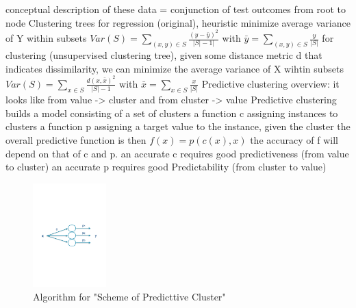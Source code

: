 \begin{outline}
            \3 conceptual description of these data = conjunction of test outcomes from root to node
    \1 Clustering trees
        \2 for regression (original), heuristic minimize average variance of Y within subsets
            \3 $Var(S) = \sum_{(x,y) \in S} \frac{(y - \bar{y})^{2}}{|S|-1|}$ 
            \3 with $\bar{y} = \sum_{(x,y) \in S} \frac{y}{|S|}$
        \2 for clustering (unsupervised clustering tree), given some distance metric d that indicates dissimilarity, we can minimize the average variance of X wihtin subsets
            \3 $Var(S) = \sum_{x \in S} \frac{d(x,\bar{x})^{2}}{|S|-1}$
            \3 with $\bar{x} = \sum_{x \in S} \frac{x}{|S|}$
    \1 Predictive clustering
        \2 overview: it looks like from value -> cluster and from cluster -> value
        \2 Predictive clustering builds a model consisting of 
            \3 a set of clusters
            \3 a function c assigning instances to clusters
            \3 a function p assigning a target value to the instance, given the cluster
        \2 the overall predictive function is then $f(x) = p(c(x),x)$
        \2 the accuracy of f will depend on that of c and p.
            \3 an accurate c requires good predictiveness (from value to cluster)
            \3 an accurate p requires good Predictability (from cluster to value)
\end{outline}

\begin{figure}[htbp]
    \centering
    \includegraphics[height=4cm]{../figs/predictive_cluster_scheme.pdf}
    \caption{Algorithm for "Scheme of Predicttive Cluster"}
    \label{fig:scheme_predictive_cluster}
\end{figure}

